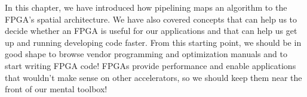 
In this chapter, we have introduced how pipelining maps an algorithm to the FPGA’s spatial architecture. We have also covered concepts that can help us to decide whether an FPGA is useful for our applications and that can help us get up and running developing code faster. From this starting point, we should be in good shape to browse vendor programming and optimization manuals and to start writing FPGA code! FPGAs provide performance and enable applications that wouldn’t make sense on other accelerators, so we should keep them near the front of our mental toolbox!\par


\newpage